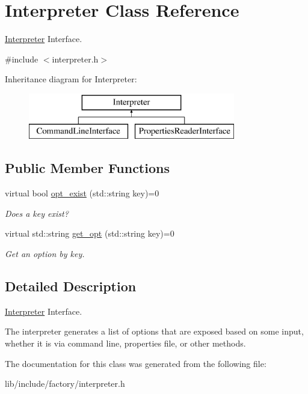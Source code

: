 \hypertarget{classInterpreter}{\section{Interpreter Class Reference}
\label{classInterpreter}
}


\hyperlink{classInterpreter}{Interpreter} Interface.  




{\ttfamily \#include $<$interpreter.\-h$>$}

Inheritance diagram for Interpreter\-:\begin{figure}[H]
\begin{center}
\leavevmode
\includegraphics[height=2.000000cm]{classInterpreter}
\end{center}
\end{figure}
\subsection*{Public Member Functions}
\begin{DoxyCompactItemize}
\item 
\hypertarget{classInterpreter_a2198ba5fcff114e80fb9241f0c8960ea}{virtual bool \hyperlink{classInterpreter_a2198ba5fcff114e80fb9241f0c8960ea}{opt\-\_\-exist} (std\-::string key)=0}\label{classInterpreter_a2198ba5fcff114e80fb9241f0c8960ea}

\begin{DoxyCompactList}\small\item\em Does a key exist? \end{DoxyCompactList}\item 
\hypertarget{classInterpreter_ab315fb1a6a89b321aaadd6eb6fd6739f}{virtual std\-::string \hyperlink{classInterpreter_ab315fb1a6a89b321aaadd6eb6fd6739f}{get\-\_\-opt} (std\-::string key)=0}\label{classInterpreter_ab315fb1a6a89b321aaadd6eb6fd6739f}

\begin{DoxyCompactList}\small\item\em Get an option by key. \end{DoxyCompactList}\end{DoxyCompactItemize}


\subsection{Detailed Description}
\hyperlink{classInterpreter}{Interpreter} Interface. 

The interpreter generates a list of options that are exposed based on some input, whether it is via command line, properties file, or other methods. 

The documentation for this class was generated from the following file\-:\begin{DoxyCompactItemize}
\item 
lib/include/factory/interpreter.\-h\end{DoxyCompactItemize}
